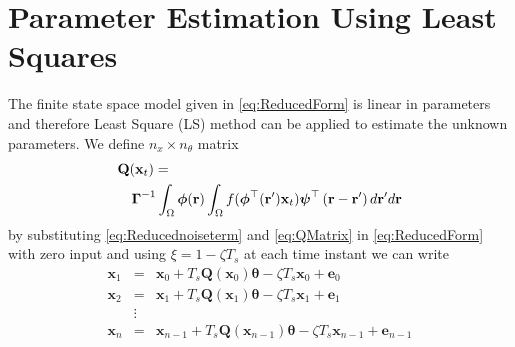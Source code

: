 \documentclass[12pt]{iopart}
\begin{document}
\section{Parameter Estimation Using Least Squares}\label{LeastSquaresAppendix} 
The finite state space model  given in \ref{eq:ReducedForm} is linear in parameters and therefore Least Square (LS) method can be applied to estimate the unknown parameters. We define $n_x \times n_{\theta}$ matrix
\begin{eqnarray}\label{eq:QMatrix}
	\lefteqn {\mathbf{Q}(\mathbf{x}_t)=} \\
&&\boldsymbol{\Gamma}^{ - 1}\int_\Omega {\boldsymbol{\phi}(\mathbf{r}) \int_\Omega {f(\boldsymbol{\phi}^{\top}(\mathbf{r}')\mathbf{x}_t)\boldsymbol{\psi}^{\top} \left(\mathbf{r}-\mathbf{r}'\right)d\mathbf{r}'} d\mathbf{r}}\nonumber
\end{eqnarray}
by substituting \ref{eq:Reducednoiseterm} and \ref{eq:QMatrix} in \ref{eq:ReducedForm} with zero input and using $\xi = 1-\zeta T_s$ at each time instant we can write
\begin{eqnarray}
	\mathbf x_{1}&=&\mathbf x_{0}+T_s \mathbf Q(\mathbf x_0) \boldsymbol{\theta}-\zeta T_s\mathbf x_0+\mathbf e_0 \nonumber \\
	\mathbf x_{2}&=&\mathbf x_{1}+T_s \mathbf Q(\mathbf x_1) \boldsymbol{\theta}-\zeta T_s\mathbf x_1+\mathbf e_1\nonumber\\
	&\vdots& \\
	\mathbf x_{n}&=&\mathbf x_{n-1}+T_s \mathbf Q(\mathbf x_{n-1}) \boldsymbol{\theta}-\zeta T_s\mathbf x_{n-1}+\mathbf e_{n-1} \nonumber
\end{eqnarray}
\end{document}
